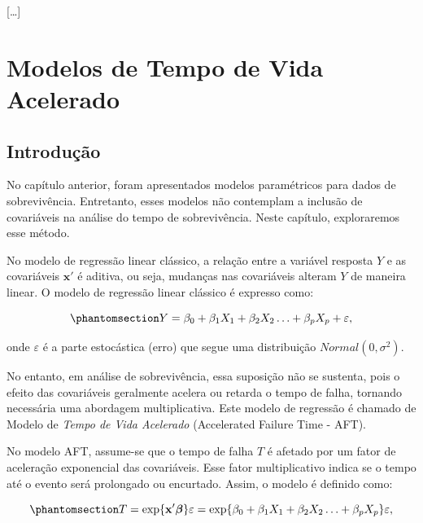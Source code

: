 \documentclass[
  12pt,
  letterpaper,
  DIV=11,
  numbers=noendperiod]{scrreprt}
\begin{document}
{[}\ldots{]}


\chapter{Modelos de Tempo de Vida
Acelerado}\label{modelos-de-tempo-de-vida-acelerado}

\section{Introdução}\label{introduuxe7uxe3o-3}

No capítulo anterior, foram apresentados modelos paramétricos para dados
de sobrevivência. Entretanto, esses modelos não contemplam a inclusão de
covariáveis na análise do tempo de sobrevivência. Neste capítulo,
exploraremos esse método.

No modelo de regressão linear clássico, a relação entre a variável
resposta \(Y\) e as covariáveis \(\mathbf{x'}\) é aditiva, ou seja,
mudanças nas covariáveis alteram \(Y\) de maneira linear. O modelo de
regressão linear clássico é expresso como:

\begin{equation}\phantomsection\label{eq-LinearModel}{
Y = \beta_{0} + \beta_{1} X_{1} + \beta_{2} X_{2} \ldots + \beta_{p} X_{p} + \varepsilon,
}\end{equation}

onde \(\varepsilon\) é a parte estocástica (erro) que segue uma
distribuição \(Normal(0, \sigma^{2})\).

No entanto, em análise de sobrevivência, essa suposição não se sustenta,
pois o efeito das covariáveis geralmente acelera ou retarda o tempo de
falha, tornando necessária uma abordagem multiplicativa. Este modelo de
regressão é chamado de Modelo de \emph{Tempo de Vida Acelerado}
(Accelerated Failure Time - AFT).

No modelo AFT, assume-se que o tempo de falha \(T\) é afetado por um
fator de aceleração exponencial das covariáveis. Esse fator
multiplicativo indica se o tempo até o evento será prolongado ou
encurtado. Assim, o modelo é definido como:

\begin{equation}\phantomsection\label{eq-RelationAFT}{
T = \exp\{ \mathbf{x'} \boldsymbol{\beta} \} \varepsilon = \exp\{ \beta_{0} + \beta_{1} X_{1} + \beta_{2} X_{2} \ldots + \beta_{p} X_{p} \} \varepsilon,
}\end{equation}
\end{document}
